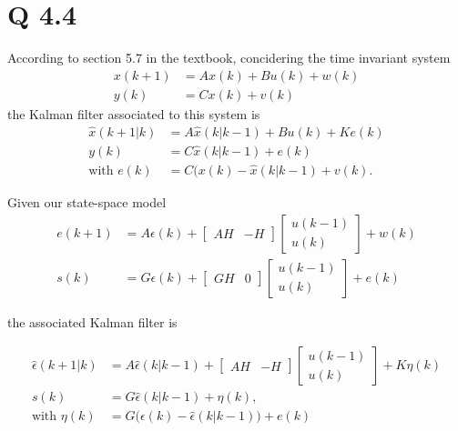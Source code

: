 \documentclass[11pt, oneside,a4paper,fleqn]{report}
\begin{document}
\section*{Q 4.4}
According to section 5.7 in the textbook, concidering the time invariant system
\begin{align*}
    x(k+1)&=Ax(k)+Bu(k)+w(k)\\
    y(k)&=Cx(k)+v(k)
\end{align*}
the Kalman filter associated to this system is
\begin{align*}
    \hat{x}(k+1|k)&=A\hat{x}(k|k-1)+Bu(k)+Ke(k)\\
    y(k)&=C\hat{x}(k|k-1)+e(k)\\
    \text{with }e(k)&=C(x(k)-\hat{x}(k|k-1)+v(k).
\end{align*}

Given our state-space model
\begin{align*}
    e(k+1)&=A\epsilon(k)+ 
        \begin{bmatrix}
            AH & -H 
        \end{bmatrix}
        \begin{bmatrix}
            u(k-1)\\
            u(k)
        \end{bmatrix}
        + w(k)\\
    s(k)&=G\epsilon(k)+
        \begin{bmatrix}
            GH & 0 
        \end{bmatrix}
        \begin{bmatrix}
            u(k-1)\\
            u(k)
        \end{bmatrix}
        + e(k)
\end{align*}

the associated Kalman filter is

\begin{align*}
    \hat{\epsilon}(k+1|k)&=A\hat{\epsilon}(k|k-1)+
    \begin{bmatrix}
        AH & -H 
    \end{bmatrix}
    \begin{bmatrix}
        u(k-1)\\
        u(k)
    \end{bmatrix}
    +K\eta(k)\\
    s(k)&=G\hat{\epsilon}(k|k-1)+\eta(k),\\
    \text{with }\eta(k)&=G\Big(\epsilon(k)-\hat{\epsilon}(k|k-1)\Big)+e(k)
\end{align*}
\end{document}
